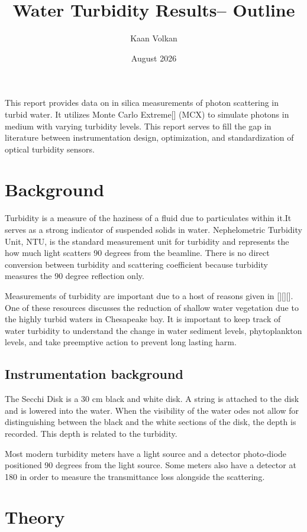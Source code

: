 \documentclass{article}
\title{Water Turbidity Results-- Outline}
\author{Kaan Volkan}
\date{August 2026}
\begin{document}
\maketitle

This report provides data on in silica measurements of photon scattering in turbid water. It utilizes Monte Carlo Extreme[] (MCX) to simulate photons in medium with varying turbidity levels. This report serves to fill the gap in literature between instrumentation design, optimization, and standardization of optical turbidity sensors.  
\section{Background}
Turbidity is a measure of the haziness of a fluid due to particulates within it.It serves as a strong indicator of suspended solids in water. Nephelometric Turbidity Unit, NTU, is the standard measurement unit for turbidity and represents the how much light scatters 90 degrees from the beamline. There is no direct conversion between turbidity and scattering coefficient because turbidity measures the 90 degree reflection only.

Measurements of turbidity are important due to a host of reasons given in [][][]. One of these resources discusses the reduction of shallow water vegetation due to the highly turbid waters in Chesapeake bay. It is important to keep track of water turbidity to understand the change in water sediment levels, phytoplankton levels, and take preemptive action to prevent long lasting harm. 

\subsection{Instrumentation background}

The Secchi Disk is a 30 cm black and white disk. A string is attached to the disk and is lowered into the water. When the visibility of the water odes not allow for distinguishing between the black and the white sections of the disk, the depth is recorded. This depth is related to the turbidity. 

Most modern turbidity meters have a light source and a detector photo-diode positioned 90 degrees from the light source. Some meters also have a detector at 180 in order to measure the transmittance loss alongside the scattering. 

\section{Theory}
\end{document}
